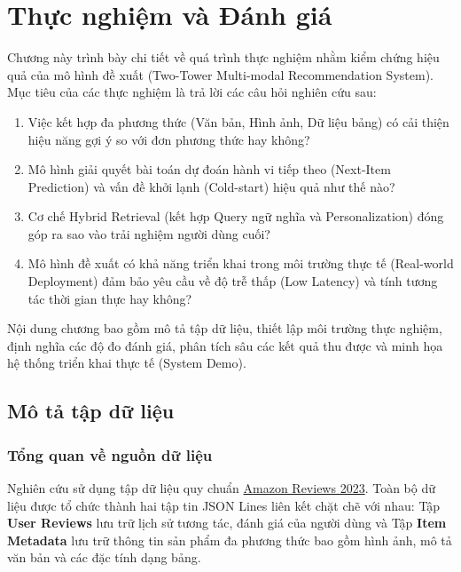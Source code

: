 \chapter{Thực nghiệm và Đánh giá}
\label{chap:experiment}

Chương này trình bày chi tiết về quá trình thực nghiệm nhằm kiểm chứng hiệu quả của mô hình đề xuất (Two-Tower Multi-modal Recommendation System). Mục tiêu của các thực nghiệm là trả lời các câu hỏi nghiên cứu sau:

\begin{enumerate}
    \item Việc kết hợp đa phương thức (Văn bản, Hình ảnh, Dữ liệu bảng) có cải thiện hiệu năng gợi ý so với đơn phương thức hay không?
    \item Mô hình giải quyết bài toán dự đoán hành vi tiếp theo (Next-Item Prediction) và vấn đề khởi lạnh (Cold-start) hiệu quả như thế nào?
    \item Cơ chế Hybrid Retrieval (kết hợp Query ngữ nghĩa và Personalization) đóng góp ra sao vào trải nghiệm người dùng cuối?
    \item Mô hình đề xuất có khả năng triển khai trong môi trường thực tế (Real-world Deployment) đảm bảo yêu cầu về độ trễ thấp (Low Latency) và tính tương tác thời gian thực hay không?
\end{enumerate}

Nội dung chương bao gồm mô tả tập dữ liệu, thiết lập môi trường thực nghiệm, định nghĩa các độ đo đánh giá, phân tích sâu các kết quả thu được và minh họa hệ thống triển khai thực tế (System Demo).

\section{Mô tả tập dữ liệu}
\label{sec:data_desc}

\subsection{Tổng quan về nguồn dữ liệu}

Nghiên cứu sử dụng tập dữ liệu quy chuẩn \href{https://amazon-reviews-2023.github.io/}{Amazon Reviews 2023}. Toàn bộ dữ liệu được tổ chức thành hai tập tin JSON Lines liên kết chặt chẽ với nhau: Tập \textbf{User Reviews} lưu trữ lịch sử tương tác, đánh giá của người dùng và Tập \textbf{Item Metadata} lưu trữ thông tin sản phẩm đa phương thức bao gồm hình ảnh, mô tả văn bản và các đặc tính dạng bảng.

